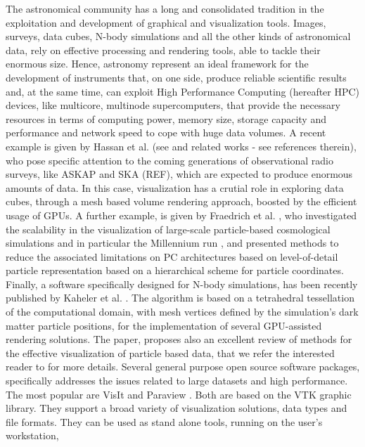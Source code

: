 \documentclass[11pt]{article}
\begin{document}
The astronomical community has a long and consolidated tradition in the exploitation and development
of graphical and visualization tools. Images, surveys, data cubes, N-body simulations and all the other kinds of
astronomical data, rely on effective processing and rendering tools, able to             
tackle their enormous size. Hence, astronomy represent an ideal framework for the 
development of instruments that, on one side, produce reliable scientific 
results and, at the same time, can  
exploit High Performance Computing (hereafter HPC) devices, like multicore, multinode
supercomputers, that provide the necessary resources in terms of computing power, memory size, 
storage capacity and performance and network speed to cope with huge data volumes.
A recent example is given by Hassan et al. (see \cite{2012ASPC..461...45H} and
related works - see references therein), 
who pose specific attention to the coming generations of observational radio surveys, like 
ASKAP and SKA (REF), which are expected to produce enormous amounts of data. 
In this case, visualization has a crutial role in exploring data cubes, 
through a mesh based volume rendering approach, boosted by the efficient usage 
of GPUs. A further example, is given by Fraedrich et al. \cite{Fraedrich:2009:TMV}, who
investigated the scalability in the visualization of large-scale particle-based cosmological 
simulations and in particular the Millennium run \cite{millennium}, and presented methods to reduce the 
associated limitations on PC architectures based on level-of-detail particle 
representation based on a hierarchical scheme for particle coordinates.
Finally, a software specifically designed for N-body simulations,
has been recently published by Kaheler et al. \cite{2012arXiv1208.3206K}. 
The algorithm is based on a tetrahedral tessellation of the computational domain, 
with mesh vertices defined by the simulation's dark matter particle positions,
for the implementation of several GPU-assisted rendering solutions. The paper, proposes
also an excellent review 
of methods for the effective visualization of particle based data, that we refer the interested reader to 
for more details.
Several general purpose open source software packages, specifically addresses the issues related to
large datasets and high performance. 
The most popular are VisIt \cite{visit} and Paraview \cite{paraview}. 
Both are based
on the VTK \cite{vtk} graphic library. They support a broad variety of visualization solutions, data types
and file formats. They can be used as stand alone tools, running on the user's workstation, 
\end{document}
